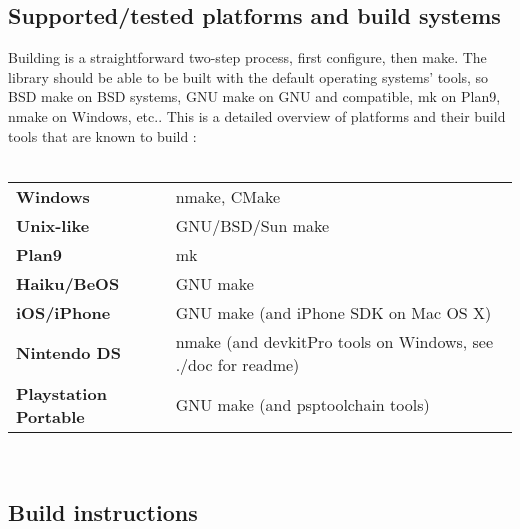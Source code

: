 \subsection{Supported/tested platforms and build systems}

Building  is a straightforward two-step process, first configure, then make. The
library should be able to be built with the default operating systems' tools, so BSD make on BSD
systems, GNU make on GNU and compatible, mk on Plan9, nmake on Windows, etc.. This is a detailed
overview of platforms and their build tools that are known to build :\\
\\



\begin{tabular}{l l}
{\bf{\large Windows}}                 & nmake, CMake                                                                 \\
{\bf{\large Unix-like}}               & GNU/BSD/Sun make                                                             \\
{\bf{\large Plan9}}                   & mk                                                                           \\
{\bf{\large Haiku/BeOS}}              & GNU make                                                                     \\
{\bf{\large iOS/iPhone}}              & GNU make (and iPhone SDK on Mac OS X)                                        \\
{\bf{\large Nintendo DS}}             & nmake (and devkitPro\cite{devkitPro} tools on Windows, see ./doc for readme) \\
{\bf{\large Playstation Portable}}    & GNU make (and psptoolchain\cite{psptoolchain} tools)                         \\

\end{tabular}\\

\pagebreak

\subsection{Build instructions}


